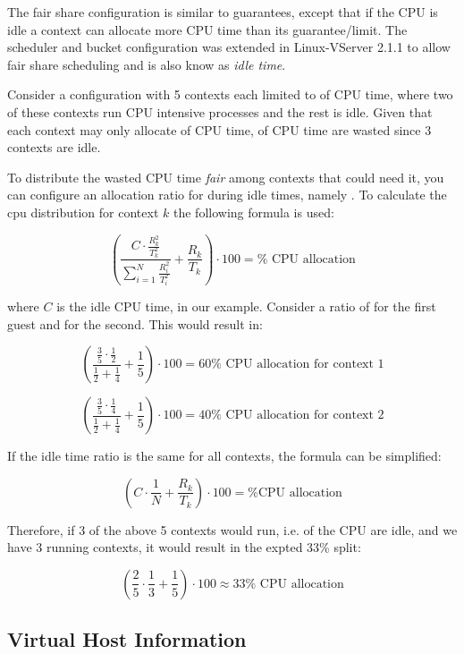 The fair share configuration is similar to guarantees, except that if the CPU
is idle a context can allocate more CPU time than its guarantee/limit. The
scheduler and bucket configuration was extended in Linux-VServer 2.1.1 to allow
fair share scheduling and is also know as \emph{idle time}.

Consider a configuration with 5 contexts each limited to  of CPU
time, where two of these contexts run CPU intensive processes and the rest is
idle. Given that each context may only allocate  of CPU time,
 of CPU time are wasted since 3 contexts are idle.

To distribute the wasted CPU time \emph{fair} among contexts that could need it,
you can configure an allocation ratio for  during idle times,
namely . To calculate the cpu distribution for context $k$
the following formula is used:

$$\left ( \frac{C \cdot \frac{R^2_k}{T^2_k}}{\sum_{i=1}^N \frac{R^2_i}{T^2_i}} +
\frac{R_k}{T_k} \right ) \cdot 100 = \%\mbox{ CPU allocation}$$

where $C$ is the idle CPU time,  in our example. Consider a
 ratio of  for the first guest and
 for the second. This would result in:

$$\left ( \frac{\frac{3}{5} \cdot \frac{1}{2}}{\frac{1}{2} + \frac{1}{4}} +
\frac{1}{5} \right ) \cdot 100 = 60\%\mbox{ CPU allocation for context 1}$$

$$\left ( \frac{\frac{3}{5} \cdot \frac{1}{4}}{\frac{1}{2} + \frac{1}{4}} +
\frac{1}{5} \right ) \cdot 100 = 40\%\mbox{ CPU allocation for context 2}$$

If the idle time ratio is the same for all contexts, the formula can be
simplified:

$$\left ( C \cdot \frac{1}{N} + \frac{R_k}{T_k} \right ) \cdot 100 = \%\mbox{
CPU allocation}$$

Therefore, if 3 of the above 5 contexts would run, i.e.  of the
CPU are idle, and we have 3 running contexts, it would result in the expted
33\% split:

$$\left ( \frac{2}{5} \cdot \frac{1}{3} + \frac{1}{5} \right ) \cdot 100
\approx 33\%\mbox{ CPU allocation}$$


\subsection{Virtual Host Information}



